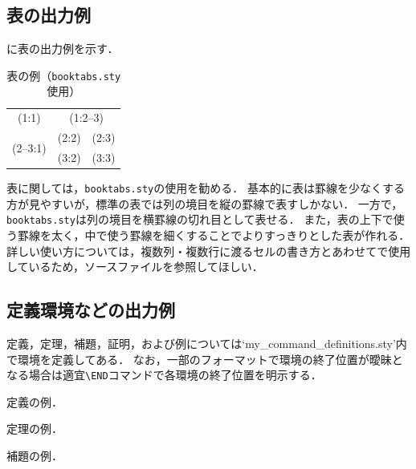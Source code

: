 \subsection{表の出力例}

\Tab{\ref{tab:sample}}に表の出力例を示す．

\begin{table}[t]
  \caption{表の例（\texttt{booktabs.sty}使用）}
  \label{tab:sample}
  \centering \small
  \begin{tabular}{ccc}
    \toprule
    (1:1)                     & \multicolumn{2}{c}{(1:2--3)}         \\
    \cmidrule(r){1-1}\cmidrule(l){2-3}
    \multirow{2}{*}{(2--3:1)} & (2:2)                        & (2:3) \\
                              & (3:2)                        & (3:3) \\
    \bottomrule
  \end{tabular}
\end{table}

表に関しては，\texttt{booktabs.sty}の使用を勧める．
基本的に表は罫線を少なくする方が見やすいが，{\LaTeXe}標準の表では列の境目を縦の罫線で表すしかない．
一方で，\texttt{booktabs.sty}は列の境目を横罫線の切れ目として表せる．
また，表の上下で使う罫線を太く，中で使う罫線を細くすることでよりすっきりとした表が作れる．
詳しい使い方については，複数列・複数行に渡るセルの書き方とあわせて\Tab{\ref{tab:sample}}で使用しているため，ソースファイルを参照してほしい．



\subsection{定義環境などの出力例}

定義，定理，補題，証明，および例については`my\_command\_definitions.sty'内で環境を定義してある．
なお，一部のフォーマットで環境の終了位置が曖昧となる場合は適宜\texttt{\textbackslash END}コマンドで各環境の終了位置を明示する．

\begin{definition}\label{def:example}
  定義の例．
  \END
\end{definition}

\begin{theorem}\label{thm:example}
  定理の例．
  \END
\end{theorem}

\begin{lemma}\label{lem:example}
  補題の例．
  \END
\end{lemma}

